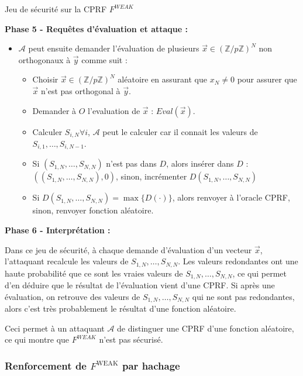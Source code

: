 \documentclass[9pt]{extarticle}
\begin{document}
\begin{defbox}{Jeu de sécurité sur la CPRF $F^{WEAK}$}
  \medskip

  \textbf{Phase 5 - Requêtes d’évaluation et attaque :}
  \begin{itemize}
  \item $\mathcal{A}$ peut ensuite demander l'évaluation de plusieurs $\vec{x} \in (\mathbb{Z}/p\mathbb{Z})^N$ non orthogonaux à $\vec{y}$ comme suit :
    \begin{itemize}
      \item Choisir $\vec{x} \in (\mathbb{Z}/p\mathbb{Z})^N$ aléatoire en assurant que $x_N \neq 0$ pour assurer que $\vec{x}$ n'est pas orthogonal à $\vec{y}$.
      \item Demander à $O$ l'evaluation de $\vec{x}$ : $Eval(\vec{x})$.
      \item Calculer $S_{i,N} \forall i$, $\mathcal{A}$ peut le calculer car il connait les valeurs de $S_{i,1},\ldots,S_{i,N-1}$.
      \item Si $(S_{1,N},\ldots,S_{N,N})$ n'est pas dans $D$, alors insérer dans $D$ : $( (S_{1,N},\ldots,S_{N,N}), 0)$, sinon, incrémenter $D(S_{1,N},\ldots,S_{N,N})$
      \item Si $D(S_{1,N},\ldots,S_{N,N}) = \max\{D(\cdot)\}$, alors renvoyer à l'oracle CPRF, sinon, renvoyer fonction aléatoire.
    \end{itemize}
  \end{itemize}

  \medskip

  \textbf{Phase 6 - Interprétation :}

  Dans ce jeu de sécurité, à chaque demande d'évaluation d'un vecteur $\vec{x}$, l'attaquant recalcule les valeurs de $S_{1,N},\ldots,S_{N,N}$. Les valeurs redondantes ont une haute probabilité que ce sont les vraies valeurs de $S_{1,N},\ldots,S_{N,N}$, ce qui permet d'en déduire que le résultat de l'évaluation vient d'une CPRF. Si après une évaluation, on retrouve des valeurs de $S_{1,N},\ldots,S_{N,N}$ qui ne sont pas redondantes, alors c'est très probablement le résultat d'une fonction aléatoire.

  \medskip

  Ceci permet à un attaquant $\mathcal{A}$ de distinguer une CPRF d'une fonction aléatoire, ce qui montre que $F^{WEAK}$ n'est pas sécurisé.

\end{defbox}



\subsubsection{Renforcement de \texorpdfstring{$F^{\text{WEAK}}$}{F WEAK} par hachage}
\end{document}
